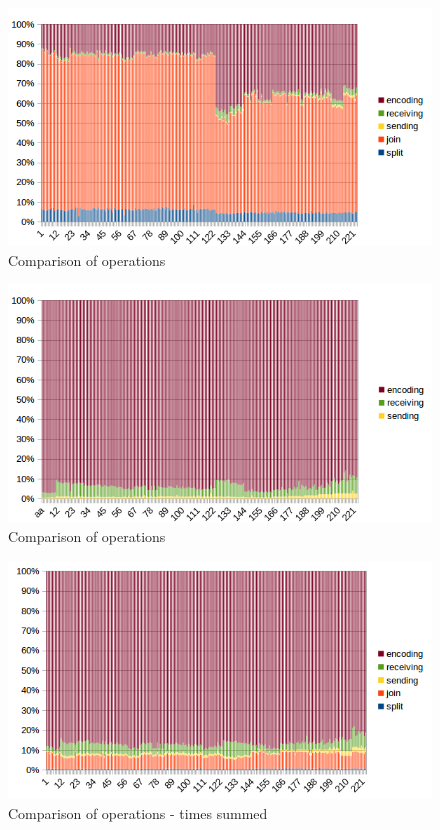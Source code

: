 \begin{figure}[h]
\begin{center}
\includegraphics[scale=0.90]{./img/chunks1.png}
\caption{Comparison of operations}
\end{center}
\end{figure}

\begin{figure}[h]
\begin{center}
\includegraphics[scale=0.90]{./img/chunks1_2.png}
\caption{Comparison of operations}
\end{center}
\end{figure}

\begin{figure}[h]
\begin{center}
\includegraphics[scale=0.90]{./img/chunks2.png}
\caption{Comparison of operations - times summed}
\end{center}
\end{figure}

